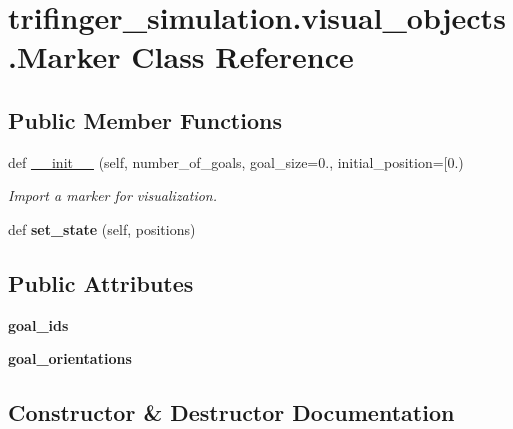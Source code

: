 \hypertarget{classtrifinger__simulation_1_1visual__objects_1_1Marker}{}\section{trifinger\+\_\+simulation.\+visual\+\_\+objects.\+Marker Class Reference}
\label{classtrifinger__simulation_1_1visual__objects_1_1Marker}
\subsection*{Public Member Functions}
\begin{DoxyCompactItemize}
\item 
def \hyperlink{classtrifinger__simulation_1_1visual__objects_1_1Marker_a0f55b90695f7f81f3fddff538712166d}{\+\_\+\+\_\+init\+\_\+\+\_\+} (self, number\+\_\+of\+\_\+goals, goal\+\_\+size=0., initial\+\_\+position=\mbox{[}0.)
\begin{DoxyCompactList}\small\item\em Import a marker for visualization. \end{DoxyCompactList}\item 
\mbox{\label{classtrifinger__simulation_1_1visual__objects_1_1Marker_a0ef424459138a3882a77ab4fd3fe3aef}} 
def {\bfseries set\+\_\+state} (self, positions)
\end{DoxyCompactItemize}
\subsection*{Public Attributes}
\begin{DoxyCompactItemize}
\item 
\mbox{\label{classtrifinger__simulation_1_1visual__objects_1_1Marker_abd7e5d3e6fdf0da94bf8c1568228cd3f}} 
{\bfseries goal\+\_\+ids}
\item 
\mbox{\label{classtrifinger__simulation_1_1visual__objects_1_1Marker_a43b31d1b05b96aed7037f7e49a90085e}} 
{\bfseries goal\+\_\+orientations}
\end{DoxyCompactItemize}


\subsection{Constructor \& Destructor Documentation}
\mbox{\label{classtrifinger__simulation_1_1visual__objects_1_1Marker_a0f55b90695f7f81f3fddff538712166d}} 
